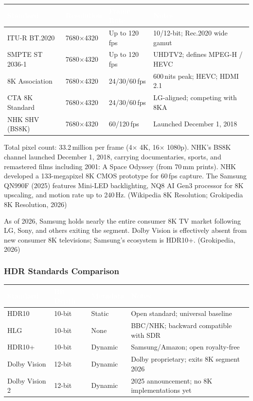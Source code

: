 \documentclass[11pt,letterpaper]{article}
\newcommand{\tableheader}[1]{\textbf{\sffamily\textcolor{white}{#1}}}
\begin{document}
\begin{center}
\begin{tabularx}{\textwidth}{L{3cm}C{2.5cm}C{2cm}X}
\toprule
{}
\tableheader{Standard} & \tableheader{Resolution} & \tableheader{Frame Rate} & \tableheader{Notes} \\
\midrule
ITU-R BT.2020 & 7680$\times$4320 & Up to 120\,fps & 10/12-bit; Rec.2020 wide gamut \\
SMPTE ST 2036-1 & 7680$\times$4320 & Up to 120\,fps & UHDTV2; defines MPEG-H / HEVC \\
8K Association & 7680$\times$4320 & 24/30/60\,fps & 600\,nits peak; HEVC; HDMI 2.1 \\
CTA 8K Standard & 7680$\times$4320 & 24/30/60\,fps & LG-aligned; competing with 8KA \\
NHK SHV (BS8K) & 7680$\times$4320 & 60/120\,fps & Launched December 1, 2018 \\
\bottomrule
\end{tabularx}
\end{center}

Total pixel count: 33.2\,million per frame (4$\times$ 4K, 16$\times$ 1080p). NHK's BS8K channel
launched December 1, 2018, carrying documentaries, sports, and remastered films including 2001:
A Space Odyssey (from 70\,mm prints). NHK developed a 133-megapixel 8K CMOS prototype for 60\,fps
capture. The Samsung QN990F (2025) features Mini-LED backlighting, NQ8 AI Gen3 processor for 8K
upscaling, and motion rate up to 240\,Hz. (Wikipedia 8K Resolution; Grokipedia 8K Resolution, 2026)

As of 2026, Samsung holds nearly the entire consumer 8K TV market following LG, Sony, and others
exiting the segment. Dolby Vision is effectively absent from new consumer 8K televisions; Samsung's
ecosystem is HDR10+. (Grokipedia, 2026)

\subsubsection{HDR Standards Comparison}

\begin{center}
\begin{tabularx}{\textwidth}{L{2.5cm}C{2cm}C{2cm}X}
\toprule
{}
\tableheader{Standard} & \tableheader{Bit Depth} & \tableheader{Metadata} & \tableheader{Notes} \\
\midrule
HDR10 & 10-bit & Static & Open standard; universal baseline \\
HLG & 10-bit & None & BBC/NHK; backward compatible with SDR \\
HDR10+ & 10-bit & Dynamic & Samsung/Amazon; open royalty-free \\
Dolby Vision & 12-bit & Dynamic & Dolby proprietary; exits 8K segment 2026 \\
Dolby Vision 2 & 12-bit & Dynamic & 2025 announcement; no 8K implementations yet \\
\bottomrule
\end{tabularx}
\end{center}
\end{document}
